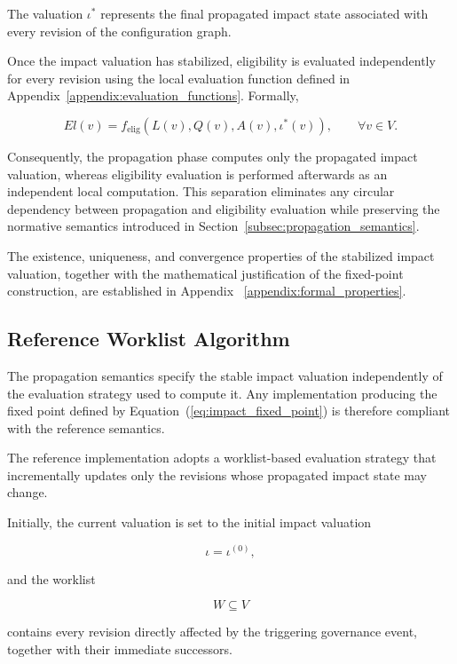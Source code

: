 \documentclass[10pt]{article}
\begin{document}
The valuation $\iota^{*}$ represents the final propagated impact state
associated with every revision of the configuration graph.

Once the impact valuation has stabilized, eligibility is evaluated
independently for every revision using the local evaluation function defined in
Appendix~\ref{appendix:evaluation_functions}. Formally,

\begin{equation}
	\label{eq:eligibility_after_propagation}
	El(v)
	=
	f_{\mathrm{elig}}
	\!\left(
	L(v),
	Q(v),
	A(v),
	\iota^{*}(v)
	\right),
	\qquad
	\forall v\in V.
\end{equation}

Consequently, the propagation phase computes only the propagated impact
valuation, whereas eligibility evaluation is performed afterwards as an
independent local computation. This separation eliminates any circular
dependency between propagation and eligibility evaluation while preserving the
normative semantics introduced in Section~\ref{subsec:propagation_semantics}.

The existence, uniqueness, and convergence properties of the stabilized impact
valuation, together with the mathematical justification of the fixed-point
construction, are established in Appendix ~\ref{appendix:formal_properties}.

\subsection{Reference Worklist Algorithm}
\label{appendix:ref_worklist_algo}
The propagation semantics specify the stable impact valuation independently of
the evaluation strategy used to compute it. Any implementation producing the
fixed point defined by Equation~(\ref{eq:impact_fixed_point}) is therefore
compliant with the reference semantics.

The reference implementation adopts a worklist-based evaluation strategy that
incrementally updates only the revisions whose propagated impact state may
change.

Initially, the current valuation is set to the initial impact valuation

\[
\iota
=
\iota^{(0)},
\]

and the worklist

\[
W
\subseteq
V
\]

contains every revision directly affected by the triggering governance event,
together with their immediate successors.
\end{document}
